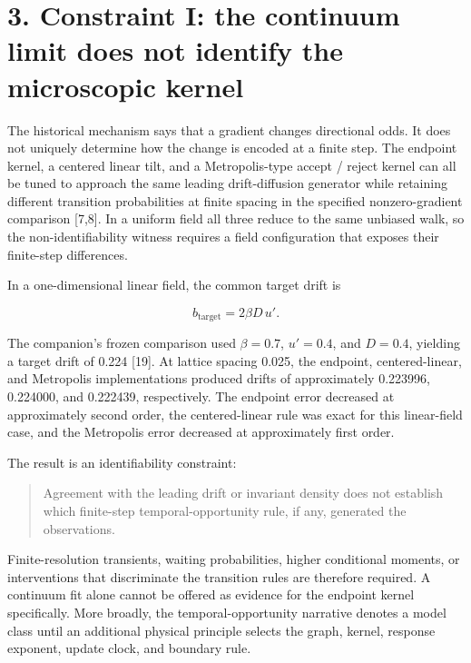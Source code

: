 \documentclass[
  american,
  11pt,
  letterpaper,
]{article}
\begin{document}
\section{3. Constraint I: the continuum limit does not identify the microscopic kernel}\label{constraint-i-the-continuum-limit-does-not-identify-the-microscopic-kernel}

The historical mechanism says that a gradient changes directional odds. It does not uniquely determine how the change is encoded at a finite step. The endpoint kernel, a centered linear tilt, and a Metropolis-type accept / reject kernel can all be tuned to approach the same leading drift-diffusion generator while retaining different transition probabilities at finite spacing in the specified nonzero-gradient comparison {[}7,8{]}. In a uniform field all three reduce to the same unbiased walk, so the non-identifiability witness requires a field configuration that exposes their finite-step differences.

In a one-dimensional linear field, the common target drift is

\begin{equation}
b_{\mathrm{target}}=2\beta D\,u'.
\tag{5}
\end{equation}

The companion's frozen comparison used \(\beta=0.7\), \(u'=0.4\), and \(D=0.4\), yielding a target drift of 0.224 {[}19{]}. At lattice spacing 0.025, the endpoint, centered-linear, and Metropolis implementations produced drifts of approximately 0.223996, 0.224000, and 0.222439, respectively. The endpoint error decreased at approximately second order, the centered-linear rule was exact for this linear-field case, and the Metropolis error decreased at approximately first order.

The result is an identifiability constraint:

\begin{quote}
Agreement with the leading drift or invariant density does not establish which finite-step temporal-opportunity rule, if any, generated the observations.
\end{quote}

Finite-resolution transients, waiting probabilities, higher conditional moments, or interventions that discriminate the transition rules are therefore required. A continuum fit alone cannot be offered as evidence for the endpoint kernel specifically. More broadly, the temporal-opportunity narrative denotes a model class until an additional physical principle selects the graph, kernel, response exponent, update clock, and boundary rule.
\end{document}
